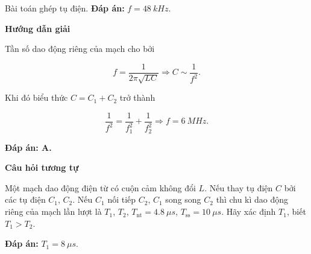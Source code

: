 \begin{dang}{Bài toán ghép tụ điện.}
{		\textbf{Đáp án:} $f= \SI{48}{kHz}.$ 
	}
	{	\begin{center}
			\textbf{Hướng dẫn giải}
		\end{center}
		
		Tần số dao động riêng của mạch cho bởi
		
		$$f=\dfrac{1}{2 \pi \sqrt{L C}} \Rightarrow C \sim \dfrac{1}{f^{2}}.$$
		
		Khi đó biểu thức $C=C_{1}+C_{2}$ trở thành
		
		$$\dfrac{1}{f^{2}}=\dfrac{1}{f_{1}^{2}}+\dfrac{1}{f_{2}^{2}} \Rightarrow  f = \SI{6}{MHz}.$$
		
		\textbf{Đáp án: A.}
		
		\begin{center}
			\textbf{Câu hỏi tương tự}
		\end{center}
		
		Một mạch dao động điện từ có cuộn cảm không đổi $L$. Nếu thay tụ điện $C$ bởi các tụ điện $C_1$, $C_2$. Nếu $C_1$ nối tiếp $C_2$, $C_1$ song song $C_2$ thì chu kì dao động riêng của mạch lần lượt là $T_1$, $T_2$, $T_\text{nt} = \SI{4,8}{\mu s}$, $T_\text{ss} = \SI{10}{\mu s}$. Hãy xác định $T_1$, biết $T_1 >T_2$.
		
		\textbf{Đáp án:} $T_1 = \SI{8}{\mu s}$.
	}
	
\end{dang}
